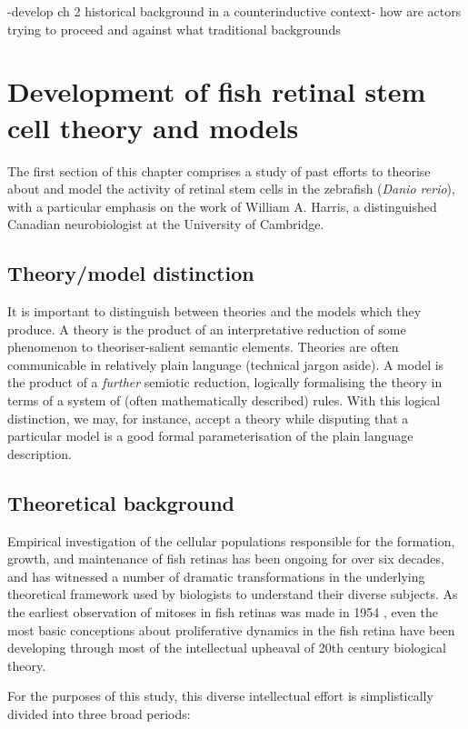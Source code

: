 -develop ch 2 historical background in a counterinductive context- how are actors trying to proceed and against what traditional backgrounds


\section{Development of fish retinal stem cell theory and models}

The first section of this chapter comprises a study of past efforts to theorise about and model the activity of retinal stem cells in the zebrafish (\textit{Danio rerio}), with a particular emphasis on the work of William A. Harris, a distinguished Canadian neurobiologist at the University of Cambridge.

\subsection{Theory/model distinction}

It is important to distinguish between theories and the models which they produce. A theory is the product of an interpretative reduction of some phenomenon to theoriser-salient semantic elements. Theories are often communicable in relatively plain language (technical jargon aside). A model is the product of a \textit{further} semiotic reduction, logically formalising the theory in terms of a system of (often mathematically described) rules. With this logical distinction, we may, for instance, accept a theory while disputing that a particular model is a good formal parameterisation of the plain language description.

\subsection{Theoretical background}

Empirical investigation of the cellular populations responsible for the formation, growth, and maintenance of fish retinas has been ongoing for over six decades, and has witnessed a number of dramatic transformations in the underlying theoretical framework used by biologists to understand their diverse subjects. As the earliest observation of mitoses in fish retinas was made in 1954 \cite{Vilter}, even the most basic conceptions about proliferative dynamics in the fish retina have been developing through most of the intellectual upheaval of 20th century biological theory.

For the purposes of this study, this diverse intellectual effort is simplistically divided into three broad periods:

